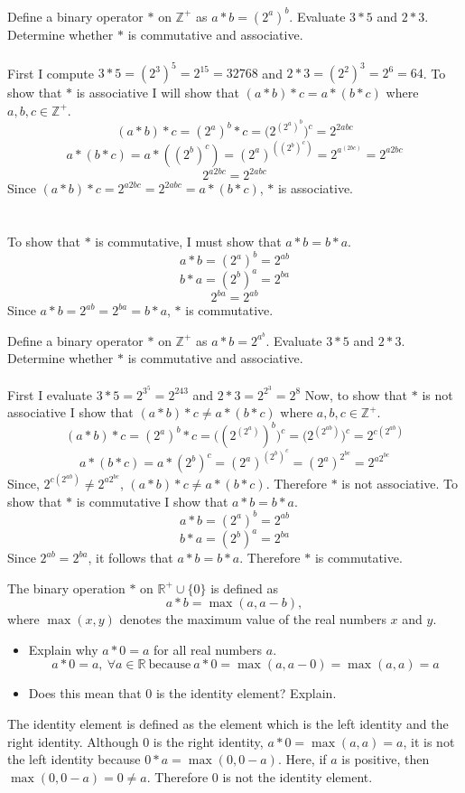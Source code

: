 \documentclass[titlepage]{article}
\newenvironment{problem}[2][Problem]{\begin{trivlist}
\item[\hskip \labelsep {\bfseries #1}\hskip \labelsep {\bfseries #2.}]}{\end{trivlist}}
\begin{document}
\begin{problem}{4}
	Define a binary operator $*$ on $\mathbb{Z}^+$ as $a*b = (2^{a})^b$. Evaluate $3*5$ and $2*3$. \\Determine whether $*$ is commutative and associative. \\ \\
	First I compute $3*5 = (2^3)^5 = 2^{15} = 32768$ and $2*3 = (2^2)^3 = 2^6 = 64$.
	To show that $*$ is associative I will show that $(a*b)*c = a*(b*c)$ where $a,b,c \in \mathbb{Z}^+$.
	$$(a*b)*c = (2^a)^b * c = \big(2^{(2^a)^b}\big)^c = 2^{2abc}$$
	$$a*(b*c) = a*((2^b)^c) = (2^a)^{((2^b)^c)} = 2^{a^{(2bc)}}= 2^{a2bc}$$
	$$ 2^{a2bc} =  2^{2abc}$$
	Since $(a*b)*c = 2^{a2bc} = 2^{2abc} = a*(b*c)$, $*$ is associative.\\ \\ \\
	To show that $*$ is commutative, I must show that $a*b = b*a$.
	$$a*b = (2^a)^b = 2^{ab}$$
	$$b*a = (2^b)^a = 2^{ba}$$
	$$2^{ba}=2^{ab}$$
	Since $a*b = 2^{ab} = 2 ^{ba} = b*a$, $*$ is commutative.
\end{problem}

\begin{problem}{5}
	Define a binary operator $*$ on $\mathbb{Z}^+$ as $a*b = 2^{a^b}$. Evaluate $3*5$ and $2*3$.\\
	Determine whether $*$ is commutative and associative.\\
	\\
	First I evaluate $3*5 = 2^{3^5} = 2^{243}$ and $2*3 = 2^{2^3} = 2^8$
	Now, to show that $*$ is not associative I show that $(a*b)*c \neq a*(b*c)$ where $a,b,c \in \mathbb{Z}^+$.
	$$(a*b)*c = (2^a)^b*c = \big((2^{(2^a)})^b\big)^c = \big(2^{(2^{ab})}\big)^c = 2^{c(2^{ab})}$$
	$$a*(b*c) = a*(2^b)^c = (2^a)^{(2^b)^c} = (2^a)^{2^{bc}} = 2^{a2^{bc}}$$
	Since, $2^{c(2^{ab})} \neq 2^{a2^{bc}}$, $(a*b)*c \neq a*(b*c)$. Therefore $*$ is not associative.
	To show that $*$ is commutative I show that $a*b = b*a$.
	$$a*b = (2^a)^b = 2^{ab}$$
	$$b*a = (2^b)^a = 2^{ba}$$
	Since $2^{ab} = 2^{ba}$, it follows that $a*b = b*a$. Therefore $*$ is commutative.

\end{problem}

\begin{problem}{6}
	The binary operation $*$ on $\mathbb{R}^+\cup\{0\}$ is defined as
	$$a*b = \max{(a,a-b)},$$
	where $\max{(x,y)}$ denotes the maximum value of the real numbers $x$ and $y$.
	\begin{itemize}
		\item[(a)] Explain why $a*0=a$ for all real numbers $a$.
	$$ a*0 = a, \ \forall a \in \mathbb{R} \ \text{because} \ a*0=\max{(a,a-0)} = \max{(a,a)} = a$$
		\item[(b)] Does this mean that 0 is the identity element? Explain.
	\end{itemize}
	The identity element is defined as the element which is the left identity and the right identity. Although $0$ is the right identity, $a*0=\max{(a,a)}=a$, it is not the left identity because $0*a=\max{(0,0-a)}$. Here, if $a$ is positive, then $\max{(0,0-a)} = 0 \neq a$. Therefore 0 is not the identity element.
\end{problem}
\end{document}
